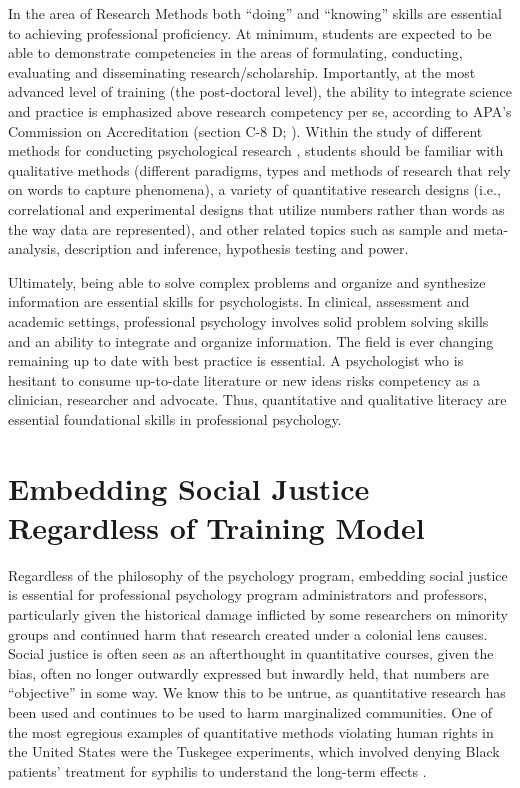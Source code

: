 \documentclass[
  11pt,
]{book}
\begin{document}
In the area of Research Methods both ``doing'' and ``knowing'' skills are essential to achieving professional proficiency. At minimum, students are expected to be able to demonstrate competencies in the areas of formulating, conducting, evaluating and disseminating research/scholarship. Importantly, at the most advanced level of training (the post-doctoral level), the ability to integrate science and practice is emphasized above research competency per se, according to APA's Commission on Accreditation (section C-8 D; \citet{commission_on_accreditation_standards_2018}). Within the study of different methods for conducting psychological research , students should be familiar with qualitative methods (different paradigms, types and methods of research that rely on words to capture phenomena), a variety of quantitative research designs (i.e., correlational and experimental designs that utilize numbers rather than words as the way data are represented), and other related topics such as sample and meta-analysis, description and inference, hypothesis testing and power.

Ultimately, being able to solve complex problems and organize and synthesize information are essential skills for psychologists. In clinical, assessment and academic settings, professional psychology involves solid problem solving skills and an ability to integrate and organize information. The field is ever changing remaining up to date with best practice is essential. A psychologist who is hesitant to consume up-to-date literature or new ideas risks competency as a clinician, researcher and advocate. Thus, quantitative and qualitative literacy are essential foundational skills in professional psychology.

\section{Embedding Social Justice Regardless of Training Model}\label{embedding-social-justice-regardless-of-training-model}

Regardless of the philosophy of the psychology program, embedding social justice is essential for professional psychology program administrators and professors, particularly given the historical damage inflicted by some researchers on minority groups and continued harm that research created under a colonial lens causes. Social justice is often seen as an afterthought in quantitative courses, given the bias, often no longer outwardly expressed but inwardly held, that numbers are ``objective'' in some way. We know this to be untrue, as quantitative research has been used and continues to be used to harm marginalized communities. One of the most egregious examples of quantitative methods violating human rights in the United States were the Tuskegee experiments, which involved denying Black patients' treatment for syphilis to understand the long-term effects \citep{cokley_defense_2013}.
\end{document}
